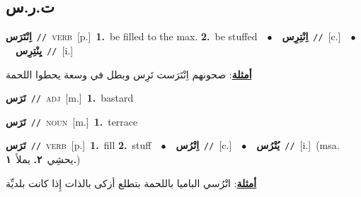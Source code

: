 \documentclass[10pt,a4paper,twoside]{article} %
\begin{document}
\begin{multicols}{2}
\vspace{-3mm}
\subsection*{\color{blue}\foreignlanguage{arabic}{ت.ر.س}\color{blue}{}} 

{\setlength\topsep{0pt}\textbf{\foreignlanguage{arabic}{اِنْتَرَس}}\ {\color{gray}\texttt{//}\color{black}}\ \textsc{verb}\ [p.]\ \textbf{1.}~be filled to the max.  \textbf{2.}~be stuffed\ \ $\bullet$\ \ \setlength\topsep{0pt}\textbf{\foreignlanguage{arabic}{اِنْتِرِس}}\ {\color{gray}\texttt{//}\color{black}}\ [c.]\ \ $\bullet$\ \ \setlength\topsep{0pt}\textbf{\foreignlanguage{arabic}{يِنْتِرِس}}\ {\color{gray}\texttt{//}\color{black}}\ [i.]\  \begin{flushright}\color{gray}\foreignlanguage{arabic}{\textbf{\underline{\foreignlanguage{arabic}{أمثلة}}}: صحونهم اِنْتَرَست تَرِس وبطل في وسعة يحطوا اللحمة}\end{flushright}\color{black}} \vspace{2mm}

{\setlength\topsep{0pt}\textbf{\foreignlanguage{arabic}{تَرَس}}\ {\color{gray}\texttt{//}\color{black}}\ \textsc{adj}\ [m.]\ \textbf{1.}~bastard\ } \vspace{2mm}

{\setlength\topsep{0pt}\textbf{\foreignlanguage{arabic}{تَرَس}}\ {\color{gray}\texttt{//}\color{black}}\ \textsc{noun}\ [m.]\ \textbf{1.}~terrace\ } \vspace{2mm}

{\setlength\topsep{0pt}\textbf{\foreignlanguage{arabic}{تَرَس}}\ {\color{gray}\texttt{//}\color{black}}\ \textsc{verb}\ [p.]\ \textbf{1.}~fill  \textbf{2.}~stuff\ \ $\bullet$\ \ \setlength\topsep{0pt}\textbf{\foreignlanguage{arabic}{اِتْرُس}}\ {\color{gray}\texttt{//}\color{black}}\ [c.]\ \ $\bullet$\ \ \setlength\topsep{0pt}\textbf{\foreignlanguage{arabic}{يُتْرُس}}\ {\color{gray}\texttt{//}\color{black}}\ [i.]\ \color{gray}(msa. \foreignlanguage{arabic}{يحشِي}~\foreignlanguage{arabic}{\textbf{٢.}}  \foreignlanguage{arabic}{يملأ}~\foreignlanguage{arabic}{\textbf{١.}})\color{black}\  \begin{flushright}\color{gray}\foreignlanguage{arabic}{\textbf{\underline{\foreignlanguage{arabic}{أمثلة}}}: اتْرُسي الباميا باللحمة بتطلع أزكى بالذات إِذا كانت بلديِّة}\end{flushright}\color{black}} \vspace{2mm}


\end{multicols}
\end{document}

